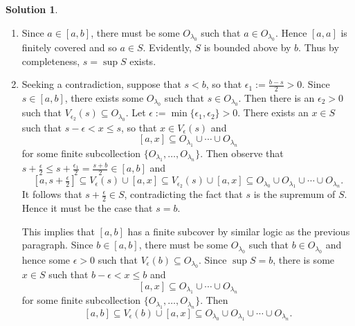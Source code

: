 \documentclass[12pt]{article}
\theoremstyle{definition}
\theoremstyle{exercise}
\theoremstyle{solution}
\newtheorem*{solution}{Solution}
\begin{document}
\begin{solution}
    \begin{enumerate}
        \item Since \( a \in [a, b] \), there must be some \( O_{\lambda_0} \) such that \( a \in O_{\lambda_0} \). Hence \( [a, a] \) is finitely covered and so \( a \in S \). Evidently, \( S \) is bounded above by \( b \). Thus by completeness, \( s = \sup S \) exists.

        \item Seeking a contradiction, suppose that \( s < b \), so that \( \epsilon_1 := \tfrac{b - s}{2} > 0 \). Since \( s \in [a, b] \), there exists some \( O_{\lambda_0} \) such that \( s \in O_{\lambda_0} \). Then there is an \( \epsilon_2 > 0 \) such that \( V_{\epsilon_2}(s) \subseteq O_{\lambda_0} \). Let \( \epsilon := \min \{ \epsilon_1, \epsilon_2 \} > 0 \). There exists an \( x \in S \) such that \( s - \epsilon < x \leq s \), so that \( x \in V_{\epsilon}(s) \) and
        \[
            [a, x] \subseteq O_{\lambda_1} \cup \cdots \cup O_{\lambda_n}
        \]
        for some finite subcollection \( \{ O_{\lambda_1}, \ldots, O_{\lambda_n} \} \). Then observe that \( s + \tfrac{\epsilon}{2} \leq s + \tfrac{\epsilon_1}{2} = \tfrac{s + b}{2} \in [a, b] \) and
        \[
            \left[ a, s + \tfrac{\epsilon}{2} \right] \subseteq V_{\epsilon}(s) \cup [a, x] \subseteq V_{\epsilon_2}(s) \cup [a, x] \subseteq O_{\lambda_0} \cup O_{\lambda_1} \cup \cdots \cup O_{\lambda_n}.
        \]
        It follows that \( s + \tfrac{\epsilon}{2} \in S \), contradicting the fact that \( s \) is the supremum of \( S \). Hence it must be the case that \( s = b \).

        This implies that \( [a, b] \) has a finite subcover by similar logic as the previous paragraph. Since \( b \in [a, b] \), there must be some \( O_{\lambda_0} \) such that \( b \in O_{\lambda_0} \) and hence some \( \epsilon > 0 \) such that \( V_{\epsilon}(b) \subseteq O_{\lambda_0} \). Since \( \sup S = b \), there is some \( x \in S \) such that \( b - \epsilon < x \leq b \) and
        \[
            [a, x] \subseteq O_{\lambda_1} \cup \cdots \cup O_{\lambda_n}
        \]
        for some finite subcollection \( \{ O_{\lambda_1}, \ldots, O_{\lambda_n} \} \). Then
        \[
            [a, b] \subseteq V_{\epsilon}(b) \cup [a, x] \subseteq O_{\lambda_0} \cup O_{\lambda_1} \cup \cdots \cup O_{\lambda_n}.
        \]


\end{enumerate}
\end{solution}
\end{document}
